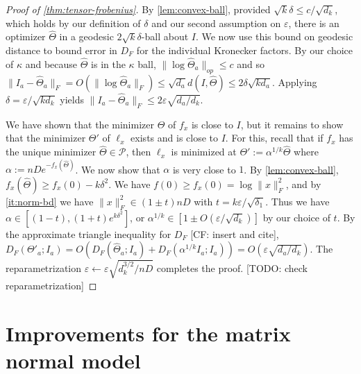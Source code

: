 \documentclass[aos]{imsart}
\theoremstyle{definition}
\numberwithin{equation}{section}
\newcommand{\eps}{\varepsilon}
\newcommand{\SPD}{\mathcal{P}}
\newcommand{\samp}{x}
\newcommand{\CF}[1]{{\color{purple}[CF: #1]}}
\newcommand{\TODO}[1]{{\color{blue}[TODO: #1]}}
\begin{document}
\begin{proof}[Proof of \cref{thm:tensor-frobenius}]

By \cref{lem:convex-ball}, provided $\sqrt{k} \delta \leq c/\sqrt{d_k}$, which holds by our definition of $\delta$ and our second assumption on $\eps$, there is an optimizer $\widehat{\Theta}$ in a geodesic $2 \sqrt{k} \delta$-ball about $I$. We now use this bound on geodesic distance to bound error in $D_F$ for the individual Kronecker factors. By our choice of $\kappa$ and because $\widehat{\Theta}$ is in the $\kappa$ ball, $\|\log \widehat{\Theta}_a\|_{op} \leq c$ and so $\|I_a - \widehat{\Theta}_a\|_F = O( \| \log \widehat{\Theta}_a\|_F) \leq \sqrt{d_a} d(I, \widehat{\Theta}) \leq 2\delta \sqrt{ k d_a}.$ Applying $\delta = \eps /\sqrt{k d_k}$ yields $\| I_a - \widehat{\Theta}_a\|_F \leq 2\eps \sqrt{ d_a/d_k}$.

We have shown that the minimizer $\widehat{\Theta}$ of $f_\samp$ is close to $I$, but it remains to show that the minimizer $\Theta'$ of $\ell_\samp$ exists and is close to $I$. For this, recall that if $f_\samp$ has the unique minimizer $\widehat{\Theta} \in \SPD$, then $\ell_\samp$ is minimized at $\Theta':= \alpha^{1/k}  \widehat{\Theta}$ where $\alpha:= n D e^{ - f_\samp(\widehat{\Theta})}$. We now show that $\alpha$ is very close to $1$. By \cref{lem:convex-ball}, $f_\samp(\widehat{\Theta}) \geq f_\samp(0) - k\delta^2$. We have $f(0) \geq f_\samp(0) = \log\| \samp\|^2_F$, and by \cref{it:norm-bd} we have $\| \samp\|_F^2 \in (1 \pm t) nD$ with $t = k \eps/\sqrt{\delta_1}$. Thus we have $\alpha \in [(1-t),  (1+t) e^{k \delta^2}]$, or $\alpha^{1/k} \in [1 \pm  O(\eps/\sqrt{d_k})]$ by our choice of $t$. By the approximate triangle inequality for $D_F$ \CF{insert and cite}, $D_F( \Theta'_a; I_a) = O(D_F(\widehat{\Theta}_a; I_a) + D_F(\alpha^{1/k} I_a; I_a)) = O(\eps \sqrt{d_a/d_k})$. The reparametrization $\eps \leftarrow \eps \sqrt{d_k^{3/2}/ n D}$ completes the proof. \TODO{check reparametrization}
\end{proof}

\section{Improvements for the matrix normal model}\label{sec:matrix-normal}
\end{document}
